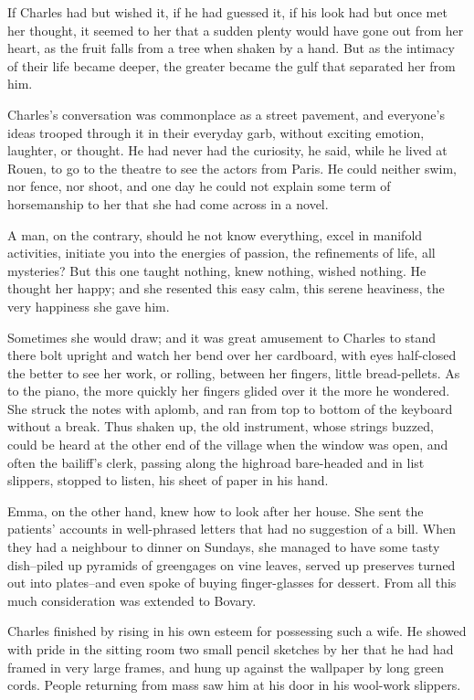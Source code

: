 \documentclass[11pt,twocolumn]{ltugboat}
\begin{document}
If Charles had but wished it, if he had guessed it, if his look had but
once met her thought, it seemed to her that a sudden plenty would have
gone out from her heart, as the fruit falls from a tree when shaken by
a hand. But as the intimacy of their life became deeper, the greater
became the gulf that separated her from him.

Charles's conversation was commonplace as a street pavement, and
everyone's ideas trooped through it in their everyday garb, without
exciting emotion, laughter, or thought. He had never had the curiosity,
he said, while he lived at Rouen, to go to the theatre to see the actors
from Paris. He could neither swim, nor fence, nor shoot, and one day
he could not explain some term of horsemanship to her that she had come
across in a novel.

A man, on the contrary, should he not know everything, excel in manifold
activities, initiate you into the energies of passion, the refinements
of life, all mysteries? But this one taught nothing, knew nothing,
wished nothing. He thought her happy; and she resented this easy calm,
this serene heaviness, the very happiness she gave him.

Sometimes she would draw; and it was great amusement to Charles to stand
there bolt upright and watch her bend over her cardboard, with eyes
half-closed the better to see her work, or rolling, between her fingers,
little bread-pellets. As to the piano, the more quickly her fingers
glided over it the more he wondered. She struck the notes with aplomb,
and ran from top to bottom of the keyboard without a break. Thus shaken
up, the old instrument, whose strings buzzed, could be heard at the
other end of the village when the window was open, and often the
bailiff's clerk, passing along the highroad bare-headed and in list
slippers, stopped to listen, his sheet of paper in his hand.

Emma, on the other hand, knew how to look after her house. She sent the
patients' accounts in well-phrased letters that had no suggestion of
a bill. When they had a neighbour to dinner on Sundays, she managed to
have some tasty dish--piled up pyramids of greengages on vine leaves,
served up preserves turned out into plates--and even spoke of buying
finger-glasses for dessert. From all this much consideration was
extended to Bovary.

Charles finished by rising in his own esteem for possessing such a wife.
He showed with pride in the sitting room two small pencil sketches by
her that he had had framed in very large frames, and hung up against the
wallpaper by long green cords. People returning from mass saw him at his
door in his wool-work slippers.
\end{document}
